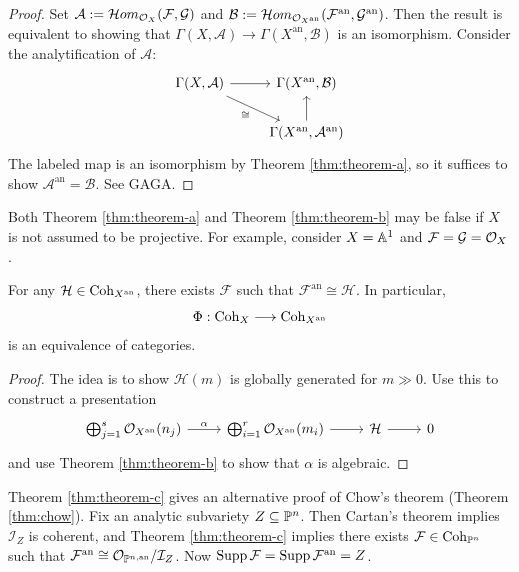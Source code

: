 \begin{proof}
  Set
  $\mathcal{A} := \mathcal{H}om_{\mathcal{O}_X}(\mathcal{F}, \mathcal{G})$ and
  $\mathcal{B} := \mathcal{H}om_{\mathcal{O}_{X^{\mathrm{an}}}}(\mathcal{F}^{\mathrm{an}}, \mathcal{G}^{\mathrm{an}})$.
  Then the result is equivalent to showing
  that $\Gamma(X, \mathcal{A})
    \to \Gamma(X^{\mathrm{an}}, \mathcal{B})$
  is an isomorphism. Consider the
  analytification of $\mathcal{A}$:
  \[
    \begin{tikzcd}
      \Gamma(X, \mathcal{A})
      \ar[r] \ar[dr, "\cong", swap] & {\Gamma(X^{\mathrm{an}}, \mathcal{B})} \\
                     & {\Gamma(X^{\mathrm{an}}, \mathcal{A}^{\mathrm{an}})} \ar[u]
    \end{tikzcd}
  \]
  The labeled map is an isomorphism by
  Theorem \ref{thm:theorem-a}, so it
  suffices to show $\mathcal{A}^{\mathrm{an}} = \mathcal{B}$.
  See GAGA.
\end{proof}

\begin{remark}
  Both Theorem \ref{thm:theorem-a} and Theorem \ref{thm:theorem-b}
  may be false if $X$ is not assumed to be
  projective. For example, consider
  $X = \mathbb{A}^1$ and
  $\mathcal{F} = \mathcal{G} = \mathcal{O}_X$.
\end{remark}

\begin{theorem}[Theorem C]\label{thm:theorem-c}
  For any $\mathcal{H} \in \operatorname{Coh}_{X^{\mathrm{an}}}$, there exists
  $\mathcal{F}$ such that
  $\mathcal{F}^{\mathrm{an}} \cong \mathcal{H}$.
  In particular,
  \[
    \Phi : \operatorname{Coh}_X \longrightarrow \operatorname{Coh}_{X^{\mathrm{an}}}
  \]
  is an equivalence of categories.
\end{theorem}

\begin{proof}
  The idea is to show
  $\mathcal{H}(m)$ is globally generated
  for $m \gg 0$. Use this to construct
  a presentation
  \[
    \begin{tikzcd}
      \bigoplus_{j = 1}^s \OO_{X^{\mathrm{an}}}(n_j)
      \ar[r, "\alpha"]
            & \bigoplus_{i = 1}^r \OO_{X^{\mathrm{an}}}(m_i)
      \ar[r] & \mathcal{H} \ar[r] & 0
    \end{tikzcd}
  \]
  and use Theorem \ref{thm:theorem-b} to
  show that $\alpha$ is algebraic.
\end{proof}

\begin{remark}
  Theorem \ref{thm:theorem-c} gives an
  alternative proof of Chow's theorem
  (Theorem \ref{thm:chow}). Fix an analytic
  subvariety $Z \subseteq \mathbb{P}^n$. Then
  Cartan's theorem implies
  $\mathcal{I}_Z$ is coherent, and
  Theorem \ref{thm:theorem-c} implies
  there exists $\mathcal{F} \in \operatorname{Coh}_{\mathbb{P}^n}$ such that
  $\mathcal{F}^{\mathrm{an}} \cong \mathcal{O}_{\mathbb{P}^{n, \mathrm{an}}}/\mathcal{I}_Z$.
  Now $\operatorname{Supp} \mathcal{F} = \operatorname{Supp} \mathcal{F}^{\mathrm{an}} = Z$.
\end{remark}
